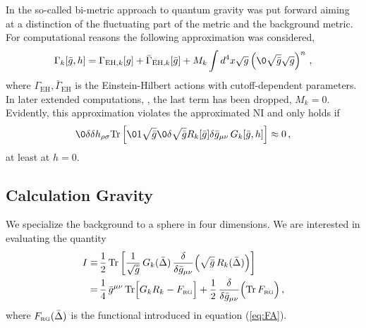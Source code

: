 \documentclass[11pt]{book} %
\newcommand{\Tr}{\mathrm{Tr}}
\begin{document}
{In \cite{Manrique:2010am} the so-called bi-metric approach to quantum
gravity was put forward aiming at a distinction of the fluctuating
part of the metric and the background metric. For computational
reasons the following approximation was considered,
\begin{align}
	\Gamma_k[\bar g,h]= \Gamma_{\text{EH},k}[g]+\bar \Gamma_{\text{EH},k}[\bar g]+M_k \int d^4 x \sqrt{g}
	\left(\0{\sqrt{\bar g}}{\sqrt{g}}\right)^n\,,
\end{align}
where $\Gamma_{\text{EH}},\bar \Gamma_{\text{EH}}$ is the
Einstein-Hilbert actions with cutoff-dependent parameters. In later
extended computations, \cite{Becker:2014qya}, the last term has been
dropped, $M_k=0$. Evidently, this approximation violates the approximated NI
 and only holds if
\begin{align}
	\0{\delta}{\delta h_{\rho\sigma}} \Tr\left[\01{\sqrt{\bar g}}\0{\delta \sqrt{\bar g} R_k[\bar g]}{\delta \bar
	g_{\mu\nu}}\, G_k[\bar g, h]\right]\approx 0\,,
\end{align}
at least at $h=0$.

\subsection{Calculation Gravity}

We specialize the background to a sphere in four dimensions.
We are interested in evaluating the quantity
\begin{align}
  \nonumber
  I \equiv&\, \frac 12 \, \Tr
  \left[
    \frac{1}{\sqrt{\bar g}} \, G_k(\bar \Delta) \, \frac{\delta}{\delta \bar g_{\mu\nu}} \Big( \sqrt{\bar g} \, R_k(\bar\Delta) \Big)
  \right]\\%
  =&\,
  \frac 14 \, \bar g^{\mu\nu} \, \Tr \Big[ G_k R_k - F_{\text{\tiny RG}}  \Big]
  + \frac{1}{2} \, \frac{\delta}{\delta \bar g_{\mu\nu}} \Big( \Tr \, F_{\text{\tiny RG}} \Big)%
  \,,
  \label{eq:def-I}
\end{align}
where $F_{\text{\tiny RG}}(\bar \Delta)$ is the functional introduced in equation (\ref{eq:FA}).

}
\end{document}

